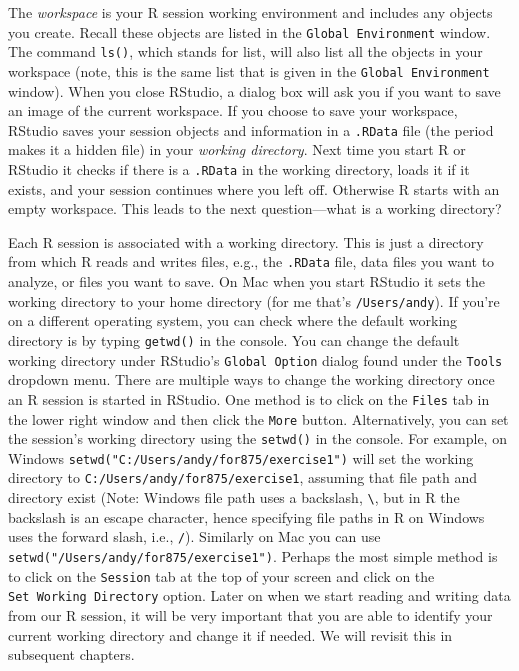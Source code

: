 \documentclass[]{krantz}
\begin{document}
The \emph{workspace} is your R session working environment and includes any objects you create. Recall these objects are listed in the \texttt{Global\ Environment} window. The command \texttt{ls()}, which stands for list, will also list all the objects in your workspace (note, this is the same list that is given in the \texttt{Global\ Environment} window). When you close RStudio, a dialog box will ask you if you want to save an image of the current workspace. If you choose to save your workspace, RStudio saves your session objects and information in a \texttt{.RData} file (the period makes it a hidden file) in your \emph{working directory}. Next time you start R or RStudio it checks if there is a \texttt{.RData} in the working directory, loads it if it exists, and your session continues where you left off. Otherwise R starts with an empty workspace. This leads to the next question---what is a working directory?

Each R session is associated with a working directory. This is just a directory from which R reads and writes files, e.g., the \texttt{.RData} file, data files you want to analyze, or files you want to save. On Mac when you start RStudio it sets the working directory to your home directory (for me that's \texttt{/Users/andy}). If you're on a different operating system, you can check where the default working directory is by typing \texttt{getwd()} in the console. You can change the default working directory under RStudio's \verb+Global Option+ dialog found under the \texttt{Tools} dropdown menu. There are multiple ways to change the working directory once an R session is started in RStudio. One method is to click on the \texttt{Files} tab in the lower right window and then click the \texttt{More} button. Alternatively, you can set the session's working directory using the \texttt{setwd()} in the console. For example, on Windows \texttt{setwd("C:/Users/andy/for875/exercise1")} will set the working directory to \texttt{C:/Users/andy/for875/exercise1}, assuming that file path and directory exist (Note: Windows file path uses a backslash, \texttt{\textbackslash{}}, but in R the backslash is an escape character, hence specifying file paths in R on Windows uses the forward slash, i.e., \texttt{/}). Similarly on Mac you can use \texttt{setwd("/Users/andy/for875/exercise1")}. Perhaps the most simple method is to click on the \texttt{Session} tab at the top of your screen and click on the \texttt{Set\ Working\ Directory} option. Later on when we start reading and writing data from our R session, it will be very important that you are able to identify your current working directory and change it if needed. We will revisit this in subsequent chapters.
\end{document}
